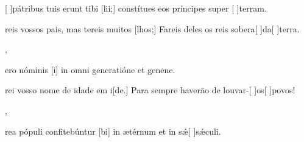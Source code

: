 {  {\item {}[ ]{pá}tribus tuis erunt tibi [lii;] constítues eos príncipes super [ ]{ter}ram.~\Antiphona}%
    {\item {}reis vossos pais, mas tereis muitos [lhos;] Fareis deles os reis sobera[ ]{da}[ ]{ter}ra.~\Antiphona},
  {\item {} ero nóminis [i] in omni generatióne et genene.~\Antiphona}%
    {\item {}rei vosso nome de idade em i[de.] Para sempre haverão de louvar-[ ]{os}[ ]{po}vos!~\Antiphona},
  {\item {}rea pópuli confitebúntur [bi] in ætérnum et in sǽ[ ]{sǽ}culi.~\Antiphona}%
    {~\Antiphona}
}